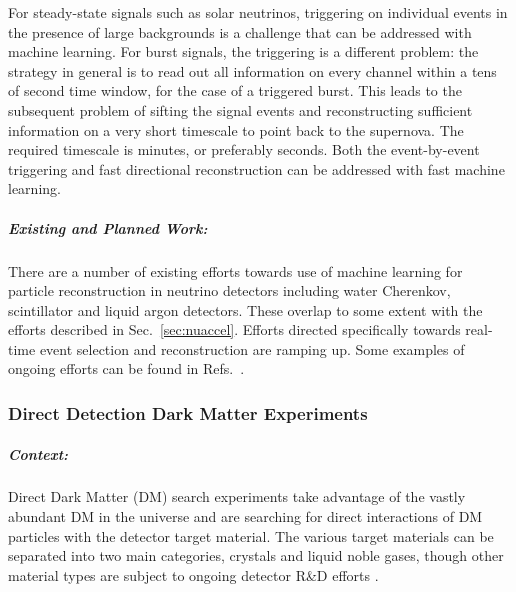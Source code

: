   For steady-state signals such as solar neutrinos, triggering on individual events in the presence of large backgrounds is a challenge that can be addressed with machine learning.  
  For burst signals, the triggering is a different problem: the strategy in general is to read out all information on every channel within a tens of second time window, for the case of a triggered burst.  
  This leads to the subsequent problem of sifting the signal events and reconstructing sufficient information on a very short timescale to point back to the supernova.  
  The required timescale is minutes, or preferably seconds.  
  Both the event-by-event triggering and fast directional reconstruction can be addressed with fast machine learning.


  
  
\subparagraph*{Existing and Planned Work:}

  There are a number of existing efforts towards use of machine learning for particle reconstruction in neutrino detectors including water Cherenkov, scintillator and liquid argon detectors. 
  These overlap to some extent with the efforts described in Sec.~\ref{sec:nuaccel}.  
  Efforts directed specifically towards real-time event selection and reconstruction are ramping up.
  Some examples of ongoing efforts can be found in Refs.~\cite{Abi_2020,Drielsma:2021jdv,Qian:2021vnh,Acciarri:2020ond,Abratenko:2020pbp,Wang:2020fjr,Psihas_2020}.  

\subsubsection{Direct Detection Dark Matter Experiments}

\subparagraph*{Context:} Direct Dark Matter (DM) search experiments take advantage of the vastly abundant DM in the universe and are searching for direct interactions of DM particles with the detector target material. The various target materials can be separated into two main categories, crystals and liquid noble gases, though other material types are subject to ongoing detector R\&D efforts \cite{alexander2016dark, Schumann_2019}.

